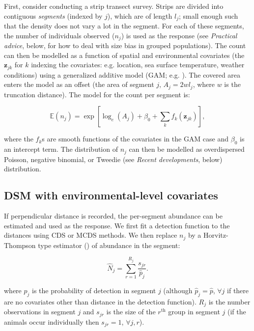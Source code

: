 \documentclass[a4paper,12pt]{article}
\begin{document}
First, consider conducting a strip transect survey. Strips are divided into contiguous \textit{segments} (indexed by $j$), which are of length $l_j$; small enough such that the density does not vary a lot in the segment. For each of these segments, the number of individuals observed ($n_j$) is used as the response (see \textit{Practical advice}, below, for how to deal with size bias in grouped populations).  The count can then be modelled as a function of spatial and environmental covariates (the $\mathbf{z}_{jk}$ for $k$ indexing the covariates: e.g. location, sea surface temperature, weather conditions) using a generalized additive model (GAM; e.g. \cite{Wood:2006wz}). The covered area enters the model as an offset (the area of segment $j$, $A_j = 2wl_j$, where $w$ is the truncation distance). The model for the count per segment is:

\begin{equation}
\mathbb{E}(n_j) = \exp\left[ \log_e \left( A_j \right) + \beta_0 + \sum_k f_k\left(\bm{z}_{jk}\right) \right],
\label{e:stripgam}
\end{equation}

where the $f_k$s are smooth functions of the covariates in the GAM case and $\beta_0$ is an intercept term. The distribution of $n_j$ can then be modelled as overdispersed Poisson, negative binomial, or Tweedie (see \textit{Recent developments}, below) distribution.

\subsection*{DSM with environmental-level covariates}

If perpendicular distance is recorded, the per-segment abundance can be estimated and used as the response. We first fit a detection function to the distances using CDS or MCDS methods. We then replace $n_j$ by a Horvitz-Thompson type estimator (\cite{Thompson:2002wi}) of abundance in the segment:

\begin{equation*}
\hat{N}_j = \sum_{r=1}^{R_j} \frac{s_{jr}}{\hat{p}_j}.
\end{equation*}

where $\hat{p}_j$ is the probability of detection in segment $j$ (although $\hat{p}_j=\hat{p}$, $\forall j$ if there are no covariates other than distance in the detection function). $R_j$ is the number observations in segment $j$ and $s_{jr}$ is the size of the $r^\text{th}$ group in segment $j$ (if the animals occur individually then $s_{jr}=1$, $\forall j,r$).
\end{document}
